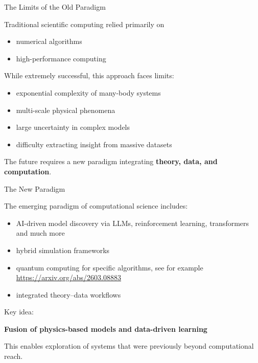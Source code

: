 \documentclass{beamer}
\begin{document}

\begin{frame}{The Limits of the Old Paradigm}

Traditional scientific computing relied primarily on

\begin{itemize}
\item numerical algorithms
\item high-performance computing
\end{itemize}

While extremely successful, this approach faces limits:

\begin{itemize}
\item exponential complexity of many-body systems
\item multi-scale physical phenomena
\item large uncertainty in complex models
\item difficulty extracting insight from massive datasets
\end{itemize}

The future requires a new paradigm integrating
\textbf{theory, data, and computation}.

\end{frame}


\begin{frame}{The New Paradigm}

The emerging paradigm of computational science includes:

\begin{itemize}
\item AI-driven model discovery via LLMs, reinforcement learning, transformers and much more
\item hybrid simulation frameworks
\item quantum computing for specific algorithms, see for example \url{https://arxiv.org/abs/2603.08883}
\item integrated theory–data workflows
\end{itemize}

Key idea:

\begin{center}
\textbf{Fusion of physics-based models and data-driven learning}
\end{center}

This enables exploration of systems that were previously
beyond computational reach.

\end{frame}
\end{document}
